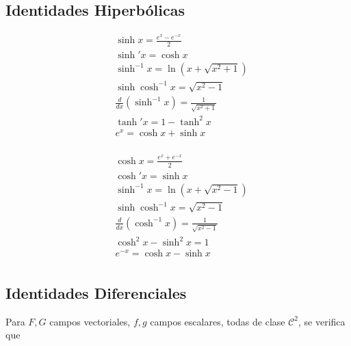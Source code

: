 \subsection{Identidades Hiperbólicas}

\begin{minipage}{0.55\textwidth}
\begin{equation}
\begin{split}
    &\sinh{x}=\frac{e^x-e^{-x}}{2}\\
    &\sinh'{x}=\cosh{x}\\
    &\sinh^{-1}{x}=\ln{(x+\sqrt{x^2+1})}\\
    &\sinh{\cosh^{-1}{x}}=\sqrt{x^2-1}\\
    &\frac{d}{dx}(\sinh^{-1}{x})=\frac{1}{\sqrt{x^2+1}}\\
    &\tanh'{x}=1-\tanh^2{x}\\
    &e^x=\cosh{x}+\sinh{x}\\
\end{split}
\nonumber
\end{equation}
\end{minipage}
\begin{minipage}{0.55\textwidth}
\begin{equation}
\begin{split}
    &\cosh{x}=\frac{e^x+e^{-x}}{2}\\
    &\cosh'{x}=\sinh{x}\\
    &\sinh^{-1}{x}=\ln{(x+\sqrt{x^2-1})}\\
    &\sinh{\cosh^{-1}{x}}=\sqrt{x^2-1}\\
    &\frac{d}{dx}(\cosh^{-1}{x})=\frac{1}{\sqrt{x^2-1}}\\
    &\cosh^2{x}-\sinh^2{x}=1\\
    &e^{-x}=\cosh{x}-\sinh{x}\\
\end{split}
\nonumber
\end{equation}
\end{minipage}

\subsection{Identidades Diferenciales}

Para $F,G$ campos vectoriales, $f,g$ campos escalares, todas de clase $\mathcal{C}^2$, se verifica que


